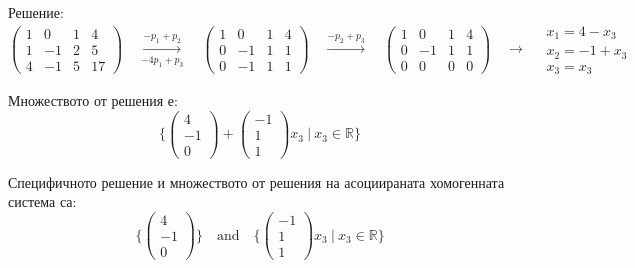 \documentclass{subfiles}
\begin{document}
\noindent Решение:
\begin{equation*}
    \left(
        \begin{array}{ ccc|c }
            1 & 0 & 1 & 4 \\
            1 & -1 & 2 & 5 \\
            4 & -1 & 5 & 17
        \end{array}
    \right)
    \quad
    \overset{-p_{1}+p_{2}}{\underset{-4p_{1}+p_{3}}{\longrightarrow}}
    \quad
    \left(
        \begin{array}{ ccc|c }
            1 & 0 & 1 & 4 \\
            0 & -1 & 1 & 1 \\
            0 & -1 & 1 & 1
        \end{array}
    \right)
    \quad
    \overset{-p_{2}+p_{3}}{\longrightarrow}
    \quad
    \left(
        \begin{array}{ ccc|c }
            1 &  0 & 1 & 4 \\
            0 & -1 & 1 & 1 \\
            0 &  0 & 0 & 0
        \end{array}
    \right)
    \quad
    \longrightarrow
    \quad
    \begin{array}{ c }
        x_{1} = 4 - x_{3} \\
        x_{2} = -1 + x_{3} \\
        x_{3} = x_{3}
    \end{array}
\end{equation*}

\noindent Множеството от решения е:
\begin{equation*}
    \{
        \left(\begin{array}{ c } 4 \\ -1 \\ 0 \end{array}\right) +
        \left(\begin{array}{ c } -1 \\ 1 \\ 1 \end{array}\right) x_{3}
        \ |\ x_{3} \in \mathbb{R}
    \}
\end{equation*}

\noindent Специфичното решение и множеството от решения на асоциираната хомогенната система са:
\begin{equation*}
    \{
        \left(\begin{array}{ c } 4 \\ -1 \\ 0 \end{array}\right)
    \}
    \quad
    \text{and}
    \quad
    \{
        \left(\begin{array}{ c } -1 \\ 1 \\ 1 \end{array}\right) x_{3}
        \ |\ x_{3} \in \mathbb{R}
    \}
\end{equation*}
\end{document}
